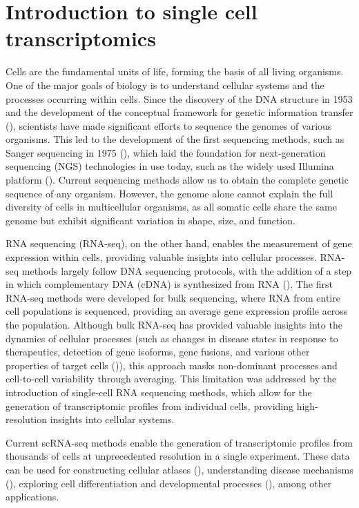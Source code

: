 \section{Introduction to single cell transcriptomics}

Cells are the fundamental units of life, forming the basis of all living organisms.
One of the major goals of biology is to understand cellular systems and the processes occurring within cells.
Since the discovery of the DNA structure in 1953
and the development of the conceptual framework for genetic information transfer (\cite{Watson1953}),
scientists have made significant efforts to sequence the genomes of various organisms.
This led to the development of the first sequencing methods, such as Sanger sequencing in 1975 (\cite{Sanger1977}),
which laid the foundation for next-generation sequencing (NGS) technologies in use today,
such as the widely used Illumina platform (\cite{Heather2016}).
Current sequencing methods allow us to obtain the complete genetic sequence of any organism.
However, the genome alone cannot explain the full diversity of cells in multicellular organisms,
as all somatic cells share the same genome but exhibit significant variation in shape, size, and function.

RNA sequencing (RNA-seq), on the other hand, enables the measurement of gene expression within cells,
providing valuable insights into cellular processes.
RNA-seq methods largely follow DNA sequencing protocols,
with the addition of a step in which complementary DNA (cDNA) is synthesized from RNA (\cite{Heumos2023}).
The first RNA-seq methods were developed for bulk sequencing, where RNA from entire cell populations is sequenced,
providing an average gene expression profile across the population.
Although bulk RNA-seq has provided valuable insights into the dynamics of cellular processes
(such as changes in disease states in response to therapeutics, detection of gene isoforms, gene fusions,
and various other properties of target cells (\cite{Heumos2023})),
this approach masks non-dominant processes and cell-to-cell variability through averaging.
This limitation was addressed by the introduction of single-cell RNA sequencing methods,
which allow for the generation of transcriptomic profiles from individual cells,
providing high-resolution insights into cellular systems.

Current scRNA-seq methods enable the generation of transcriptomic profiles from thousands of cells
at unprecedented resolution in a single experiment.
These data can be used for constructing cellular atlases (\cite{Rozenblatt2017}),
understanding disease mechanisms (\cite{Galen2019}),
exploring cell differentiation and developmental processes (\cite{Chu2016}), among other applications.

